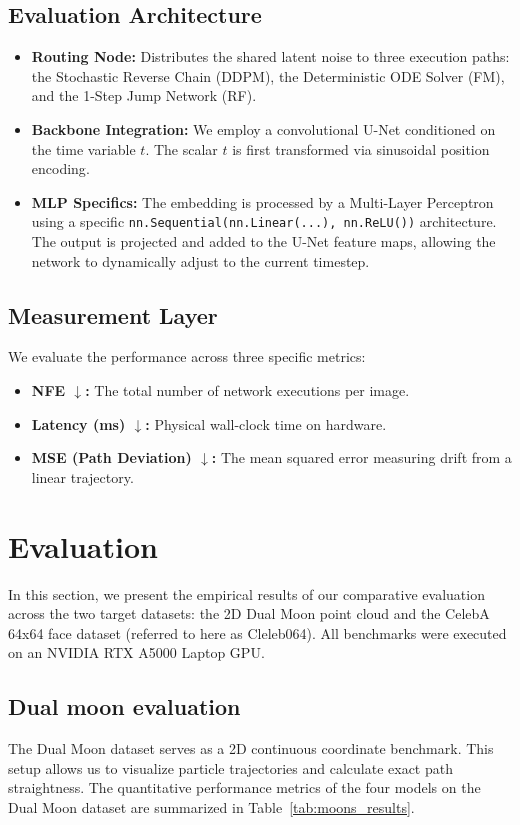 \documentclass[11pt,a4paper]{article}
\begin{document}
\subsection{Evaluation Architecture}
\begin{itemize}
    \item \textbf{Routing Node:} Distributes the shared latent noise to three execution paths: the Stochastic Reverse Chain (DDPM), the Deterministic ODE Solver (FM), and the 1-Step Jump Network (RF)\cite{87}.
    \item \textbf{Backbone Integration:} We employ a convolutional U-Net conditioned on the time variable $t$\cite{119}. The scalar $t$ is first transformed via sinusoidal position encoding\cite{119}.
    \item \textbf{MLP Specifics:} The embedding is processed by a Multi-Layer Perceptron using a specific \texttt{nn.Sequential(nn.Linear(...), nn.ReLU())} architecture\cite{121}. The output is projected and added to the U-Net feature maps, allowing the network to dynamically adjust to the current timestep\cite{119}.
\end{itemize}

\subsection{Measurement Layer}
We evaluate the performance across three specific metrics\cite{87}:
\begin{itemize}
    \item \textbf{NFE $\downarrow$:} The total number of network executions per image\cite{87}.
    \item \textbf{Latency (ms) $\downarrow$:} Physical wall-clock time on hardware\cite{87}.
    \item \textbf{MSE (Path Deviation) $\downarrow$:} The mean squared error measuring drift from a linear trajectory\cite{87}.
\end{itemize}

\section{Evaluation}
In this section, we present the empirical results of our comparative evaluation across the two target datasets: the 2D Dual Moon point cloud and the CelebA 64x64 face dataset (referred to here as Cleleb064). All benchmarks were executed on an NVIDIA RTX A5000 Laptop GPU.

\subsection{Dual moon evaluation}
The Dual Moon dataset serves as a 2D continuous coordinate benchmark. This setup allows us to visualize particle trajectories and calculate exact path straightness. The quantitative performance metrics of the four models on the Dual Moon dataset are summarized in Table~\ref{tab:moons_results}.
\end{document}
